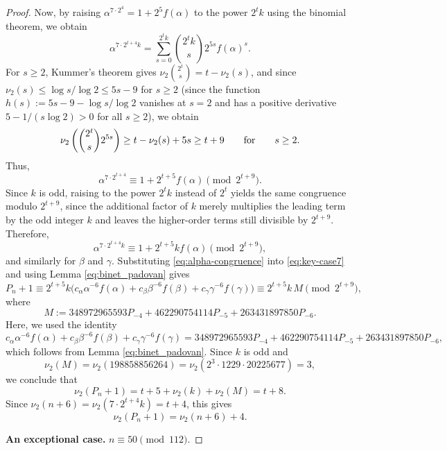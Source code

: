 \documentclass[10pt,a4paper]{amsart}
\begin{document}
\begin{proof}
	Now, by raising $\alpha^{7\cdot 2^4}=1+2^5 f(\alpha)$ 
	to the power $2^tk$ using the binomial theorem, we obtain
	\begin{equation*}
		\alpha^{7\cdot 2^{t+4}k} 
		= \sum_{s=0}^{2^t k}\binom{2^t k}{s} 2^{5s}f(\alpha)^s.
	\end{equation*}
	For $s\ge 2$, Kummer's theorem gives 
	$\nu_2\binom{2^t}{s}=t-\nu_2(s)$, and since 
	$\nu_2(s)\le \log s/\log 2\le 5s-9$ for $s\ge 2$ 
	(since the function $h(s):=5s-9-\log s/\log 2$ vanishes 
	at $s=2$ and has a positive derivative $5-1/(s\log 2)>0$ 
	for all $s\ge 2$), 
	we obtain
	\begin{equation*}
		\nu_2\left(\binom{2^t}{s}2^{5s}\right) 
		\ge t-\nu_2(s)+5s \ge t+9\qquad {\text{\rm for}}\qquad s\ge 2.
	\end{equation*}
	Thus, 
	$$\alpha^{7\cdot 2^{t+4}}\equiv 1+2^{t+5}f(\alpha)\pmod {2^{t+9}}.
	$$
Since $k$ is odd, raising to the power $2^t k$ instead of $2^t$ yields the same congruence modulo $2^{t+9}$, since the additional factor of $k$ merely multiplies the leading term by the odd integer $k$ and leaves the higher-order terms still divisible by $2^{t+9}$. Therefore,
	\begin{equation}\label{eq:alpha-congruence}
		\alpha^{7\cdot 2^{t+4}k} 
		\equiv 1+2^{t+5}kf(\alpha)\pmod{2^{t+9}},
	\end{equation}
	and similarly for $\beta$ and $\gamma$. Substituting 
	\eqref{eq:alpha-congruence} into \eqref{eq:key-case7} 
	and using Lemma \ref{eq:binet_padovan} gives
	$$
		P_n+1 
		\equiv 2^{t+5}k\bigl(c_{\alpha}\alpha^{-6}f(\alpha)
		+c_{\beta}\beta^{-6}f(\beta)
		+c_{\gamma}\gamma^{-6}f(\gamma)\bigr)\equiv 2^{t+5}k\,M\pmod{2^{t+9}},
	$$
	where
	$$
		M := 348972965593P_{-4}
		+462290754114P_{-5}
		+263431897850P_{-6}.
	$$
	Here, we used the identity 
	$$c_{\alpha}\alpha^{-6}f(\alpha)+c_{\beta}\beta^{-6}f(\beta)
	+c_{\gamma}\gamma^{-6}f(\gamma)=348972965593P_{-4}+462290754114P_{-5}	+263431897850P_{-6},$$
 which follows from Lemma \ref{eq:binet_padovan}. Since $k$ is odd and 
 $$
 \nu_2(M)=\nu_2(198858856264)=\nu_{2}(2^3\cdot 1229\cdot 20225677)=3,
 $$ 
 we conclude that
	\begin{equation*}
		\nu_2(P_n+1) = t+5+\nu_2(k)+\nu_2(M) 
		= t+8.
	\end{equation*}
	Since $\nu_2(n+6)=\nu_2(7\cdot 2^{t+4}k)=t+4$, this gives
	\begin{equation*}
		\nu_2(P_n+1) = \nu_2(n+6)+4.
	\end{equation*}
	
	\medskip
	\noindent\textbf{An exceptional case.} $n\equiv 50\pmod{112}$.
	

\end{proof}
\end{document}
